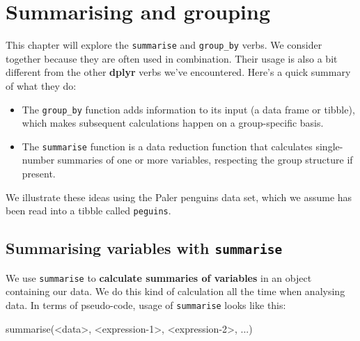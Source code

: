 \documentclass[
]{book}
\newenvironment{Shaded}{\begin{snugshade}}{\end{snugshade}}
\newcommand{\DecValTok}[1]{\textcolor[rgb]{0.00,0.00,0.81}{#1}}
\newcommand{\FunctionTok}[1]{\textcolor[rgb]{0.00,0.00,0.00}{#1}}
\newcommand{\NormalTok}[1]{#1}
\newcommand{\SpecialCharTok}[1]{\textcolor[rgb]{0.00,0.00,0.00}{#1}}
\begin{document}
\hypertarget{summarising-and-grouping}{%
\chapter{Summarising and grouping}\label{summarising-and-grouping}}

This chapter will explore the \texttt{summarise} and \texttt{group\_by} verbs. We consider together because they are often used in combination. Their usage is also a bit different from the other \textbf{dplyr} verbs we've encountered. Here's a quick summary of what they do:

\begin{itemize}
\item
  The \texttt{group\_by} function adds information to its input (a data frame or tibble), which makes subsequent calculations happen on a group-specific basis.
\item
  The \texttt{summarise} function is a data reduction function that calculates single-number summaries of one or more variables, respecting the group structure if present.
\end{itemize}

We illustrate these ideas using the Paler penguins data set, which we assume has been read into a tibble called \texttt{peguins}.

\hypertarget{summarising-variables-with-summarise}{%
\section{\texorpdfstring{Summarising variables with \texttt{summarise}}{Summarising variables with summarise}}\label{summarising-variables-with-summarise}}

We use \texttt{summarise} to \textbf{calculate summaries of variables} in an object containing our data. We do this kind of calculation all the time when analysing data. In terms of pseudo-code, usage of \texttt{summarise} looks like this:

\begin{Shaded}
\begin{Highlighting}[]
\FunctionTok{summarise}\NormalTok{(}\SpecialCharTok{\textless{}}\NormalTok{data}\SpecialCharTok{\textgreater{}}\NormalTok{, }\SpecialCharTok{\textless{}}\NormalTok{expression}\DecValTok{{-}1}\SpecialCharTok{\textgreater{}}\NormalTok{, }\SpecialCharTok{\textless{}}\NormalTok{expression}\DecValTok{{-}2}\SpecialCharTok{\textgreater{}}\NormalTok{, ...)}
\end{Highlighting}
\end{Shaded}
\end{document}
